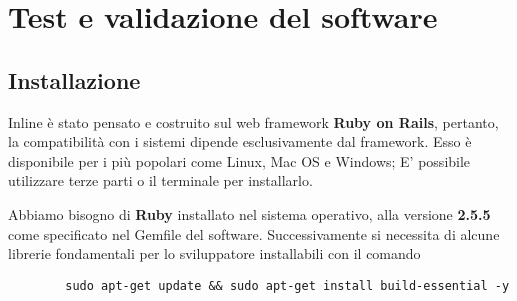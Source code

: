 \chapter{Test e validazione del software}

	\section{Installazione}
	Inline è stato pensato e costruito sul web framework \textbf{Ruby on Rails}, pertanto, la compatibilità con i sistemi dipende esclusivamente dal framework. Esso è disponibile per i più popolari come Linux, Mac OS e Windows; E' possibile utilizzare terze parti o il terminale per installarlo.
	
	Abbiamo bisogno di \textbf{Ruby} installato nel sistema operativo, alla versione \textbf{2.5.5} come specificato nel Gemfile del software. Successivamente si necessita di alcune librerie fondamentali per lo sviluppatore installabili con il comando
	\begin{lstlisting}
		sudo apt-get update && sudo apt-get install build-essential -y
	\end{lstlisting}